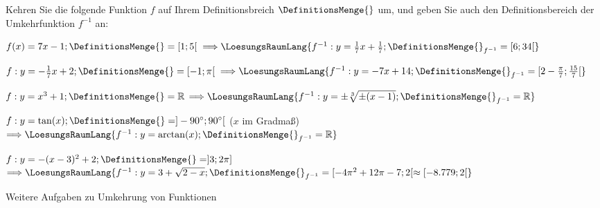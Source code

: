 

\renewcommand{\bbwAufgabenBlockID}{Finv}

\renewcommand{\metaHeaderLine}{Funktionen}
\renewcommand{\arbeitsblattTitel}{Umkehrfunktionen}



\arbeitsblattHeader{}

Kehren Sie die folgende Funktion $f$ auf Ihrem Definitionsbreich
$\DefinitionsMenge{}$ um, und geben Sie auch den Definitionsbereich der
Umkehrfunktion $f^{-1}$ an:


\begin{bbwAufgabenBlock}
\item $f(x) = 7x-1; \DefinitionsMenge{} = [1;5[$
$\Longrightarrow \LoesungsRaumLang{
f^{-1}: y=\frac17 x + \frac17; \DefinitionsMenge{}_{f^{-1}} = [6;34[
}$

\item $f:  y = -\frac17x + 2; \DefinitionsMenge{} = [-1;\pi[$
$\Longrightarrow \LoesungsRaumLang{
f^{-1}: y=-7x+14; \DefinitionsMenge{}_{f^{-1}} = [2-\frac{\pi}{7};\frac{15}{7}[
}$

\item $f:  y = x^3  + 1; \DefinitionsMenge{} = \mathbb{R}$
$\Longrightarrow \LoesungsRaumLang{
f^{-1}: y=\pm\sqrt[3]{\pm(x-1)}; \DefinitionsMenge{}_{f^{-1}} = \mathbb{R}
}$\noTRAINER{\newpage}

\item $f:  y = \tan(x); \DefinitionsMenge{} = ]-90^{\circ};90^{\circ}[$ ($x$ im Gradmaß)
$\Longrightarrow \LoesungsRaumLang{
f^{-1}: y=\arctan(x); \DefinitionsMenge{}_{f^{-1}} = \mathbb{R}
}$

\item $f:  y = -(x-3)^2 + 2; \DefinitionsMenge{} = ]3;2\pi]$
$\Longrightarrow \LoesungsRaumLang{
f^{-1}: y=3+\sqrt{2-x}; \DefinitionsMenge{}_{f^{-1}} = [-4\pi^2+12\pi-7;2[
\approx{} [-8.779;2[
}$

\end{bbwAufgabenBlock}
\noTRAINER{\newpage}



Weitere Aufgaben zu Umkehrung von Funktionen


